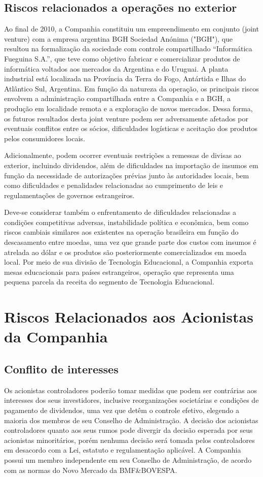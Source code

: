 {{{\subsection{Riscos relacionados a operações no exterior}
Ao final de 2010, a Companhia constituiu um empreendimento em conjunto (joint venture) com a empresa argentina BGH Sociedad Anónima ("BGH"), que resultou na formalização da sociedade com controle compartilhado “Informática Fueguina S.A.”, que teve como objetivo fabricar e comercializar produtos de informática voltados aos mercados da Argentina e do Uruguai. A planta industrial está localizada na Província da Terra do Fogo, Antártida e Ilhas do Atlântico Sul, Argentina. Em função da natureza da operação, os principais riscos envolvem a administração compartilhada entre a Companhia e a BGH, a produção em localidade remota e a exploração de novos mercados. Dessa forma, os futuros resultados desta joint venture podem ser adversamente afetados por eventuais conflitos entre os sócios, dificuldades logísticas e aceitação dos produtos pelos consumidores locais. 

Adicionalmente, podem ocorrer eventuais restrições a remessas de divisas ao exterior, incluindo dividendos, além de dificuldades na importação de insumos em função da necessidade de autorizações prévias junto às autoridades locais, bem como dificuldades e penalidades relacionadas ao cumprimento de leis e regulamentações de governos estrangeiros.

Deve-se considerar também o enfrentamento de dificuldades relacionadas a condições competitivas adversas, instabilidade política e econômica, bem como riscos cambiais similares aos existentes na operação brasileira em função do descasamento entre moedas, uma vez que grande parte dos custos com insumos é atrelada ao dólar e os produtos são posteriormente comercializados em moeda local. Por meio de sua divisão de Tecnologia Educacional, a Companhia exporta mesas educacionais para países estrangeiros, operação que representa uma pequena parcela da receita do segmento de Tecnologia Educacional. 

\section{Riscos Relacionados aos Acionistas da Companhia}

\subsection{Conflito de interesses}
Os acionistas controladores poderão tomar medidas que podem ser contrárias aos interesses dos seus investidores, inclusive reorganizações societárias e condições de pagamento de dividendos, uma vez que detêm o controle efetivo, elegendo a maioria dos membros de seu Conselho de Administração. A decisão dos acionistas controladores quanto aos seus rumos pode divergir da decisão esperada por seus acionistas minoritários, porém nenhuma decisão será tomada pelos controladores em desacordo com a Lei, estatuto e regulamentação aplicável. A Companhia possui um membro independente em seu Conselho de Administração, de acordo com as normas do Novo Mercado da BMF\&BOVESPA.

}}}
